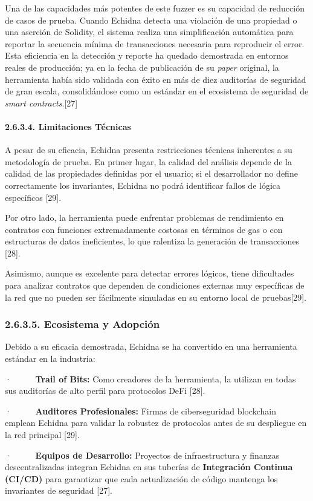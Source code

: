 Una de las capacidades más potentes de este fuzzer es su capacidad de
reducción de casos de prueba. Cuando Echidna detecta una violación de
una propiedad o una aserción de Solidity, el sistema realiza una
simplificación automática para reportar la secuencia mínima de
transacciones necesaria para reproducir el error. Esta eficiencia en la
detección y reporte ha quedado demostrada en entornos reales de
producción; ya en la fecha de publicación de su \emph{paper} original,
la herramienta había sido validada con éxito en más de diez auditorías
de seguridad de gran escala, consolidándose como un estándar en el
ecosistema de seguridad de \emph{smart contracts}.{[}27{]}

\paragraph{2.6.3.4. Limitaciones
Técnicas}\label{limitaciones-tuxe9cnicas-1}

A pesar de su eficacia, Echidna presenta restricciones técnicas
inherentes a su metodología de prueba. En primer lugar, la calidad del
análisis depende de la calidad de las propiedades definidas por el
usuario; si el desarrollador no define correctamente los invariantes,
Echidna no podrá identificar fallos de lógica específicos {[}29{]}.

Por otro lado, la herramienta puede enfrentar problemas de rendimiento
en contratos con funciones extremadamente costosas en términos de gas o
con estructuras de datos ineficientes, lo que ralentiza la generación de
transacciones {[}28{]}.

Asimismo, aunque es excelente para detectar errores lógicos, tiene
dificultades para analizar contratos que dependen de condiciones
externas muy específicas de la red que no pueden ser fácilmente
simuladas en su entorno local de pruebas{[}29{]}.

\subsubsection{2.6.3.5. Ecosistema y
Adopción}\label{ecosistema-y-adopciuxf3n-1}

Debido a su eficacia demostrada, Echidna se ha convertido en una
herramienta estándar en la industria:

·~~~~~ \textbf{Trail of Bits:} Como creadores de la herramienta, la
utilizan en todas sus auditorías de alto perfil para protocolos DeFi
{[}28{]}.

·~~~~~ \textbf{Auditores Profesionales:} Firmas de ciberseguridad
blockchain emplean Echidna para validar la robustez de protocolos antes
de su despliegue en la red principal {[}29{]}.

·~~~~~ \textbf{Equipos de Desarrollo:} Proyectos de infraestructura y
finanzas descentralizadas integran Echidna en sus tuberías de
\textbf{Integración Continua (CI/CD)} para garantizar que cada
actualización de código mantenga los invariantes de seguridad {[}27{]}.
